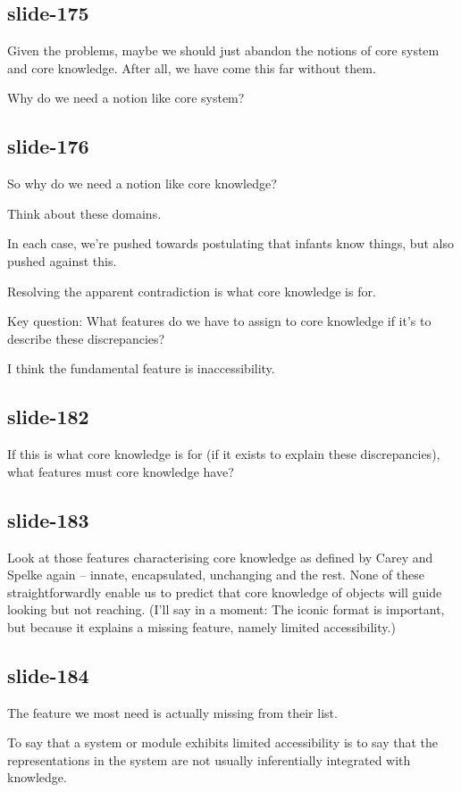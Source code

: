 \documentclass[12pt,\papersize]{extarticle}
\begin{document}
\subsection{slide-175}
Given the problems, maybe we should just abandon the notions of core system and core knowledge.
After all, we have come this far without them.
 
Why do we need a notion like core system?
 
\subsection{slide-176}
So why do we need a notion like core knowledge?
 
Think about these domains.
 
In each case, we're pushed towards postulating that infants know things, but also pushed against this.
 
Resolving the apparent contradiction is what core knowledge is for.
 
Key question: What features do we have to assign to core knowledge if it's to describe these discrepancies?
 
I think the fundamental feature is inaccessibility.
 
\subsection{slide-182}
If this is what core knowledge is for (if it exists to explain these discrepancies), what features must core knowledge have?
 
\subsection{slide-183}
Look at those features characterising core knowledge as defined by Carey and Spelke again
-- innate, encapsulated, unchanging and the rest.
None of these straightforwardly enable us to predict that core knowledge of objects will 
guide looking but not reaching.
(I'll say in a moment: 
The iconic format is important, but because it explains a missing feature, namely limited
accessibility.)
 
\subsection{slide-184}
The feature we most need is actually missing from their list.
 
To say that a system or module exhibits limited accessibility is to say that the representations in the system are not usually inferentially integrated with knowledge.
 
\end{document}
